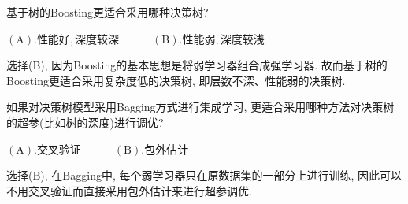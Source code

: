\documentclass{article}
\begin{document}
\begin{homeworkProblem}
	基于树的Boosting更适合采用哪种决策树?

	$\left( \text{A} \right) . \text{性能好}, \text{深度较深}\quad \quad \quad \left( \text{B} \right) . \text{性能弱}, \text{深度较浅}$

	\solution 选择(B), 因为Boosting的基本思想是将弱学习器组合成强学习器. 故而基于树的Boosting更适合采用复杂度低的决策树, 即层数不深、性能弱的决策树.
\end{homeworkProblem}


\begin{homeworkProblem}
	如果对决策树模型采用Bagging方式进行集成学习, 更适合采用哪种方法对决策树的超参(比如树的深度)进行调优?

	$\left( \text{A} \right) . \text{交叉验证}\quad \quad \quad \left( \text{B} \right) . \text{包外估计}$

	\solution 选择(B), 在Bagging中, 每个弱学习器只在原数据集的一部分上进行训练, 因此可以不用交叉验证而直接采用包外估计来进行超参调优.
\end{homeworkProblem}





%
\end{document}
